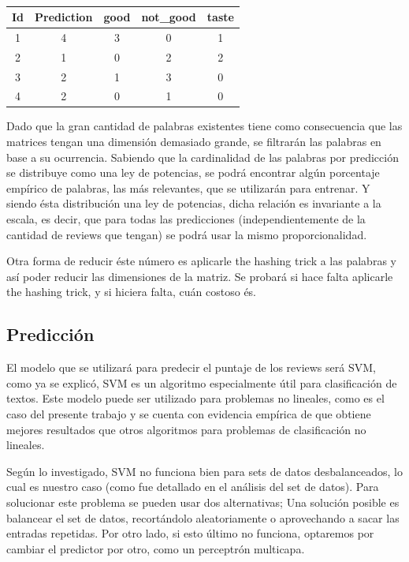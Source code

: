 \documentclass[10pt,a4paper]{article}
\begin{document}
\begin{table}[H]
    \centering
    \begin{tabular}{|ccccc|}
    \hline
     Id& Prediction & good & not\_good & taste \\ \hline \hline
     1 & 4 & 3 & 0 & 1 \\
     2 & 1 & 0 & 2 & 2 \\
     3 & 2 & 1 & 3 & 0\\
     4 & 2 & 0 & 1 & 0\\ \hline
    \end{tabular}
    \caption{}
\end{table}

Dado que la gran cantidad de palabras existentes tiene como consecuencia que las matrices tengan una dimensión demasiado grande, se filtrarán las palabras en base a su ocurrencia. Sabiendo que la cardinalidad de las palabras por predicción se distribuye como una ley de potencias, se podrá encontrar algún porcentaje empírico de palabras, las más relevantes, que se utilizarán para entrenar. Y siendo ésta distribución una ley de potencias, dicha relación es invariante a la escala, es decir, que para todas las predicciones (independientemente de la cantidad de reviews que tengan) se podrá usar la mismo proporcionalidad.

Otra forma de reducir éste número es aplicarle the hashing trick a las palabras y así poder reducir las dimensiones de la matriz. Se probará si hace falta aplicarle the hashing trick, y si hiciera falta, cuán costoso és. 

\subsection{Predicción}
El modelo que se utilizará para predecir el puntaje de los reviews será SVM, como ya se explicó, SVM es un algoritmo especialmente útil para clasificación de textos. Este modelo puede ser utilizado para problemas no lineales, como es el caso del presente trabajo \cite{svm_crammer} y se cuenta con evidencia empírica de que obtiene mejores resultados que otros algoritmos para problemas de clasificación no lineales. \cite{svm_thorsten}

Según lo investigado, SVM no funciona bien para sets de datos desbalanceados\cite{quora}, lo cual es nuestro caso (como fue detallado en el análisis del set de datos). Para solucionar este problema se pueden usar dos alternativas; Una solución posible es balancear el set de datos, recortándolo aleatoriamente o aprovechando a sacar las entradas repetidas. Por otro lado, si esto último no funciona, optaremos por cambiar el predictor por otro, como un perceptrón multicapa.
\end{document}
